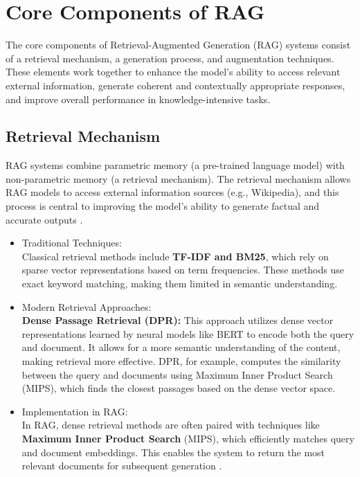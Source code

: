 \section{Core Components of RAG}
The core components of Retrieval-Augmented Generation (RAG) systems consist of a retrieval mechanism, a generation process, and augmentation techniques. These elements work together to enhance the model's ability to access relevant external information, generate coherent and contextually appropriate responses, and improve overall performance in knowledge-intensive tasks.
\subsection{ Retrieval Mechanism}
RAG systems combine parametric memory (a pre-trained language model) with non-parametric memory (a retrieval mechanism). The retrieval mechanism allows RAG models to access external information sources (e.g., Wikipedia), and this process is central to improving the model's ability to generate factual and accurate outputs \cite{lewis2020retrieval}.
\begin{itemize}
	\item Traditional Techniques: \\
	Classical retrieval methods include \textbf{TF-IDF and BM25}, which rely on sparse vector representations based on term frequencies. These methods use exact keyword matching, making them limited in semantic understanding.
	\item Modern Retrieval Approaches:\\
	\textbf{ Dense Passage Retrieval (DPR): }This approach utilizes dense vector representations learned by neural models like BERT to encode both the query and document. It allows for a more semantic understanding of the content, making retrieval more effective. DPR, for example, computes the similarity between the query and documents using Maximum Inner Product Search (MIPS), which finds the closest passages based on the dense vector space.
	\item Implementation in RAG:\\ In RAG, dense retrieval methods are often paired with techniques like \textbf{Maximum Inner Product Search} (MIPS), which efficiently matches query and document embeddings. This enables the system to return the most relevant documents for subsequent generation \cite{karpukhin2020dense}.
	
\end{itemize}
